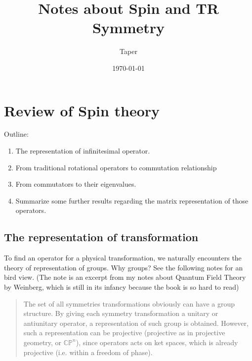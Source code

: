 \documentclass{article}
\title{Notes about Spin and TR Symmetry}
\date{\today}
\author{Taper}
\numberwithin{equation}{subsection} %
\theoremstyle{definition}
\begin{document}
\maketitle
{}
\tableofcontents

\section{Review of Spin theory}
\label{sec:Review-of-Spin-theory}
Outline:
\begin{enumerate}
    \item The representation of infinitesimal operator.
    \item From traditional rotational operators to commutation
        relationship
    \item From commutators to their eigenvalues.
    \item Summarize some further results regarding the matrix
        representation of those operators.
\end{enumerate}

\subsection{The representation of transformation}
\label{sec:The-representation-of-transformation}

To find an operator for a physical transformation, we naturally encounters
the theory of representation of groups. Why groups? See the following
notes for an bird view. (The note is an excerpt from my notes about
Quantum Field Theory by Weinberg, which is still in its infancy because
the book is so hard to read)
\begin{quote}
    The set of all symmetries transformations obviously can have a group
    structure. By giving each symmetry transformation a unitary or
    antiunitary operator, a representation of such group is obtained.
    However, such a representation can be projective (projective as in
    projective geometry, or $\mathbb{CP}^n$), since operators acts on ket
    spaces, which is already projective (i.e. within a freedom of phase). 
\end{quote}
\end{document}
